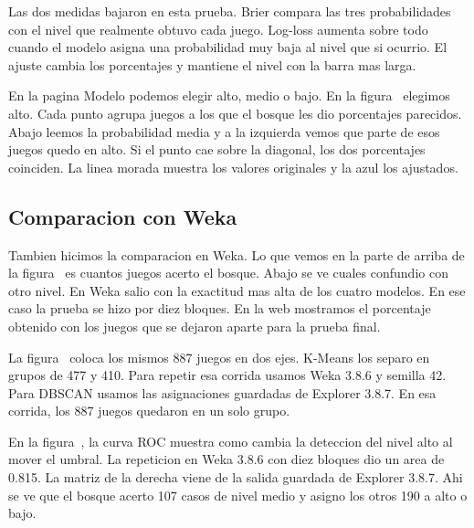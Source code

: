 \MetricasCalibracion

Las dos medidas bajaron en esta prueba. Brier compara las tres probabilidades con el nivel que realmente obtuvo cada juego. Log-loss aumenta sobre todo cuando el modelo asigna una probabilidad muy baja al nivel que si ocurrio. El ajuste cambia los porcentajes y mantiene el nivel con la barra mas larga.

En la pagina Modelo podemos elegir alto, medio o bajo. En la figura~ elegimos alto. Cada punto agrupa juegos a los que el bosque les dio porcentajes parecidos. Abajo leemos la probabilidad media y a la izquierda vemos que parte de esos juegos quedo en alto. Si el punto cae sobre la diagonal, los dos porcentajes coinciden. La linea morada muestra los valores originales y la azul los ajustados.


\subsection{Comparacion con Weka}
Tambien hicimos la comparacion en Weka. Lo que vemos en la parte de arriba de la figura~ es cuantos juegos acerto el bosque. Abajo se ve cuales confundio con otro nivel. En Weka salio con la exactitud mas alta de los cuatro modelos. En ese caso la prueba se hizo por diez bloques. En la web mostramos el porcentaje obtenido con los juegos que se dejaron aparte para la prueba final.

\ResultadosWeka
{}

La figura~ coloca los mismos 887 juegos en dos ejes. K-Means los separo en grupos de 477 y 410. Para repetir esa corrida usamos Weka 3.8.6 y semilla 42. Para DBSCAN usamos las asignaciones guardadas de Explorer 3.8.7. En esa corrida, los 887 juegos quedaron en un solo grupo.


En la figura~, la curva ROC muestra como cambia la deteccion del nivel alto al mover el umbral. La repeticion en Weka 3.8.6 con diez bloques dio un area de 0.815. La matriz de la derecha viene de la salida guardada de Explorer 3.8.7. Ahi se ve que el bosque acerto 107 casos de nivel medio y asigno los otros 190 a alto o bajo.

